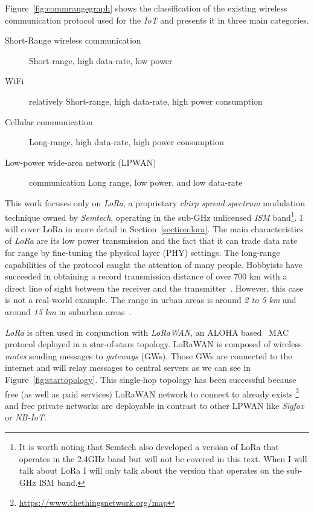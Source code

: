 Figure~\ref{fig:commrangegraph} shows the classification
of the existing wireless communication protocol used for the \emph{IoT} and
presents it in three main categories.

\begin{description}
    \item[Short-Range wireless communication] Short-range, high
        data-rate, low power
    \item[WiFi] relatively Short-range, high
        data-rate, high power consumption
    \item[Cellular communication] Long-range, high data-rate, high power
        consumption
    \item[Low-power wide-area network (LPWAN)] communication Long range,
        low power, and low data-rate
\end{description}



This work focuses only on \emph{LoRa}, a proprietary \emph{chirp spread spectrum}
modulation technique owned by \emph{Semtech}, operating in the sub-GHz
unlicensed \emph{ISM} band\footnote{It is worth noting that Semtech also developed a version of LoRa that
operates in the 2.4GHz band but will not be covered in this text. When I will talk
about LoRa I will only talk about the version that operates on the sub-GHz ISM band.}. 
I will cover LoRa in more detail in Section~\ref{section:lora}.
The main characteristics of \emph{LoRa} are its low power transmission and the
fact that it can trade data rate for range by fine-tuning the physical layer
(PHY) settings.
The long-range capabilities of the protocol caught the attention of
many people. 
Hobbyists have succeeded in obtaining a record transmission distance of over 700 km with
a direct line of sight between the receiver and the
transmitter~\cite{network_2017}.
However, this case is not a real-world example. The range in urban areas is
around \emph{2 to 5 km} and around \emph{15 km} in suburban
areas~\cite{8030482}.

\emph{LoRa} is often used in conjunction with \emph{LoRaWAN}, an ALOHA 
based~\cite{loraalliance:lorawanspecification} MAC protocol deployed in a star-of-stars 
topology.
LoRaWAN is composed of wireless \emph{motes} sending messages to \emph{gateways} (GWs).
Those GWs are connected to the internet and will relay messages to central servers
as we can see in Figure~\ref{fig:startopology}.
This single-hop topology has been successful because free (as well as paid
services) LoRaWAN network to connect to already exists
\footnote{\url{https://www.thethingsnetwork.org/map}} and free private networks are
deployable in contrast to other LPWAN like \emph{Sigfox} or \emph{NB-IoT}.

